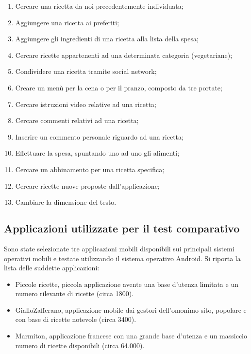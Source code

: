 \begin{enumerate}
	\item Cercare una ricetta da noi precedentemente individuata;
	\item Aggiungere una ricetta ai preferiti;
	\item Aggiungere gli ingredienti di una ricetta alla lista della spesa;
	\item Cercare ricette appartenenti ad una determinata categoria
		(vegetariane);
	\item Condividere una ricetta tramite social network;
	\item Creare un menù per la cena o per il pranzo, composto da tre portate;
	\item Cercare istruzioni video relative ad una ricetta;
	\item Cercare commenti relativi ad una ricetta;
	\item Inserire un commento personale riguardo ad una ricetta;
	\item Effettuare la spesa, spuntando uno ad uno gli alimenti;
	\item Cercare un abbinamento per una ricetta specifica;
	\item Cercare ricette nuove proposte dall'applicazione;
	\item Cambiare la dimensione del testo.
\end{enumerate}

\subsection{Applicazioni utilizzate per il test comparativo}
Sono state selezionate tre applicazioni mobili disponibili sui principali sistemi operativi mobili
e testate utilizzando il sistema operativo Android.  Si riporta la lista delle
suddette applicazioni:
\begin{itemize}
	\item Piccole ricette\cite{PiccoleRicette}, piccola applicazione avente una base d'utenza
	limitata e un numero rilevante di ricette (circa 1800).
\item GialloZafferano\cite{GialloZafferano}, applicazione mobile dai gestori dell'omonimo
	sito, popolare e con base di ricette notevole (circa 3400).
\item Marmiton\cite{Marmiton}, applicazione francese con una grande base d'utenza e
	un massiccio numero di ricette disponibili (circa 64.000).
\end{itemize}

